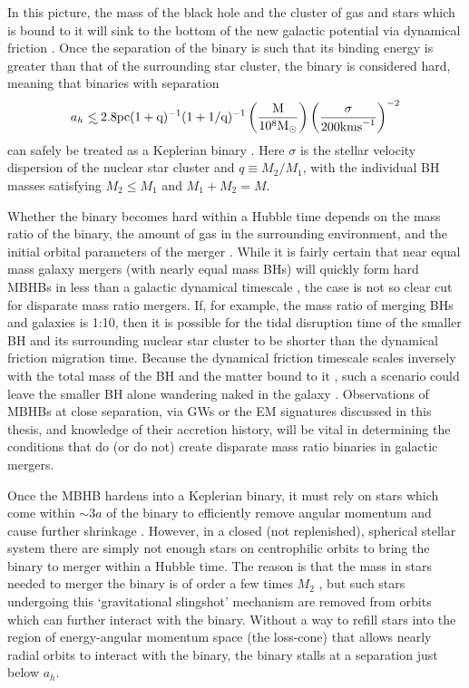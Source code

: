 In this picture, the mass of the black hole and the cluster of gas and stars
which is bound to it will sink to the bottom of the new galactic potential via
dynamical friction \citep{Begel:Blan:Rees:1980, Chandrasekhar:1943}. Once the
separation of the binary is such that its binding energy is
greater than that of the surrounding star cluster, the binary is considered
hard, meaning that binaries with separation
\begin{equation}
a_h \lsim 2.8 \rm{pc} (1+q)^{-1} (1+1/q)^{-1}  \left( \frac{M}{10^8 \Msun} \right)  
\left( \frac{\sigma}{200 \rm{km s}^{-1}} \right)^{-2}
\end{equation}
can safely be treated as a Keplerian binary
\citep[\emph{e.g.}][]{MerrittMilos:2005:LRR}. Here $\sigma$ is the stellar
velocity dispersion of the nuclear star cluster and $q\equiv M_2/M_1$, with
the individual BH masses satisfying $M_2 \leq M_1$ and $M_1+M_2=M$.

Whether the binary becomes hard within a Hubble time depends on the mass ratio
of the binary, the amount of gas in the surrounding environment, and the
initial orbital parameters of the merger \citep{Mayer:2013:MBHBGasRev}. While
it is fairly certain that near equal mass galaxy mergers (with nearly equal
mass BHs) will quickly form hard MBHBs in less than a galactic dynamical
timescale \citep{Mayer:2007, Chapon:2013}, the case is not so clear cut for
disparate mass ratio mergers. If, for example, the mass ratio of merging BHs
and galaxies is 1:10, then it is possible for the tidal disruption time of the
smaller BH and its surrounding nuclear star cluster to be shorter than the
dynamical friction migration time. Because the dynamical friction timescale
scales inversely with the total mass of the BH and the matter bound to it
\citep{Chandrasekhar:1943, ColpiDotti:2011:rev}, such a scenario could leave the
smaller BH alone wandering naked in the galaxy \citep{Callegari:2011,
Mayer:2013}. Observations of MBHBs at close separation, via GWs or the EM
signatures discussed in this thesis, and knowledge of their accretion history,
will be vital in determining the conditions that do (or do not) create
disparate mass ratio binaries in galactic mergers.

Once the MBHB hardens into a Keplerian binary, it must rely on stars which
come within $\sim3a$ of the binary to efficiently remove angular momentum and
cause further shrinkage \citep{Saslaw:1974}. However, in a closed (not
replenished),  spherical stellar system there are simply not enough stars on
centrophilic orbits to bring the binary to merger within a Hubble time. The
reason is that the mass in stars needed to merger the binary is of order a few
times $M_2$ \citep{MerrittMilos:2005:LRR}, but such stars undergoing this
`gravitational slingshot' mechanism are removed from orbits which can further
interact with the binary. Without a way to refill stars into the region of
energy-angular momentum space (the loss-cone) that allows nearly radial orbits
to interact with the binary, the binary stalls at a separation just below
$a_h$.

